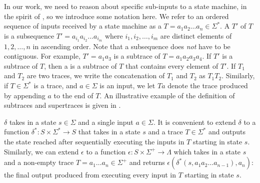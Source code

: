 In our work, we need to reason about specific sub-inputs to a state machine, in
the spirit of \whyprovenance{}, so we introduce some notation here. We refer to
an ordered sequence of inputs received by a state machine as a 
$T = a_1 a_2 \ldots a_n \in \Sigma^*$. A  $T'$ of $T$ is a
subsequence $T' = a_{i_1} a_{i_2} \ldots a_{i_m}$ where $i_1, i_2, \ldots, i_m$
are distinct elements of $1, 2, \ldots, n$ in ascending order. Note that a
subsequence does \emph{not} have to be contiguous. For example, $T' = a_1 a_3$
is a subtrace of $T = a_1 a_2 a_3 a_4$. If $T'$ is a subtrace of $T$, then a
 is a subtrace of $T$ that contains every
element of $T'$. If $T_1$ and $T_2$ are two traces, we write the concatenation
of $T_1$ and $T_2$ as $T_1T_2$. Similarly, if $T \in \Sigma^*$ is a trace, and
$a \in \Sigma$ is an input, we let $Ta$ denote the trace produced by appending
$a$ to the end of $T$. An illustrative example of the definition of subtraces
and supertraces is given in .

{}

$\delta$ takes in a state $s \in \Sigma$ and a single input $a \in \Sigma$.
It is convenient to extend $\delta$ to a function $\delta^*: S \times \Sigma^*
\to S$ that takes in a state $s$ and a trace $T \in \Sigma^*$ and outputs the
state reached after sequentially executing the inputs in $T$ starting in state
$s$. Similarly, we can extend $\epsilon$ to a function $\epsilon: S \times
\Sigma^+ \to \Lambda$ which takes in a state $s$ and a non-empty trace $T = a_1
\ldots a_n \in \Sigma^+$ and returns $\epsilon(\delta^*(s, a_1 a_2 \ldots
a_{n-1}), a_n)$: the final output produced from executing every input in $T$
starting in state $s$.
